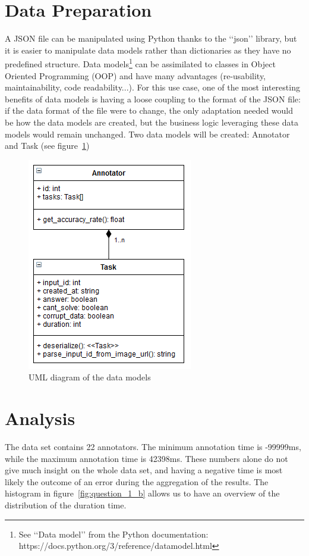 \documentclass[letterpaper,12pt]{article}
\begin{document}
\section{Data Preparation}

A JSON file can be manipulated using Python thanks to the ‘‘json’’ library, but it is easier to manipulate data models rather than dictionaries as they have no predefined structure. Data models\footnote{See ‘‘Data model’’ from the Python documentation: https://docs.python.org/3/reference/datamodel.html} can be assimilated to classes in Object Oriented Programming (OOP) and have many advantages (re-usability, maintainability, code readability...). For this use case, one of the most interesting benefits of data models is having a loose coupling to the format of the JSON file: if the data format of the file were to change, the only adaptation needed would be how the data models are created, but the business logic leveraging these data models would remain unchanged.
Two data models will be created: Annotator and Task (see
figure~\ref{fig:data_models})

\renewcommand\thefigure{3}
\begin{figure}[hb] 
        \centering \includegraphics{uml.PNG}
        \caption{
                \label{fig:data_models}
                UML diagram of the data models
        }
\end{figure}

\newpage
\section{Analysis}
The data set contains 22 annotators. The minimum annotation time is -99999ms, while the maximum annotation time is 42398ms. These numbers alone do not give much insight on the whole data set, and having a negative time is most likely the outcome of an error during the aggregation of the results. The histogram in figure~\ref{fig:question_1_b} allows us to have an overview of the distribution of the duration time.
\end{document}
